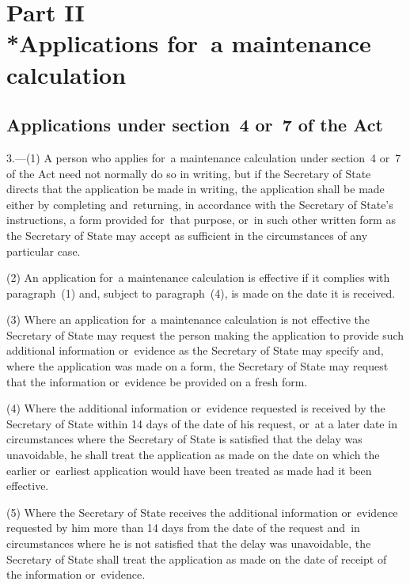 \documentclass[12pt,a4paper]{article}
\begin{document}
\section[Part II --- Applications for~a maintenance calculation]{Part II\\*Applications for~a maintenance calculation}

\renewcommand\parthead{--- Part II}

\subsection[3. Applications under section~4 or~7 of the Act]{Applications under section~4 or~7 of the Act}

3.---(1)  A person who applies for~a maintenance calculation under section~4 or~7 of the Act need not normally do so in writing, but if the Secretary of State directs that the application be made in writing, the application shall be made either by completing and~returning, in accordance with the Secretary of State’s instructions, a form provided for~that purpose, or~in such other written form as the Secretary of State may accept as sufficient in the circumstances of any particular case.

(2) An application for~a maintenance calculation is effective if it complies with paragraph~(1) and, subject to paragraph~(4), is made on the date it is received.

(3) Where an application for~a maintenance calculation is not effective the Secretary of State may request the person making the application to provide such additional information or~evidence as the Secretary of State may specify and, where the application was made on a form, the Secretary of State may request that the information or~evidence be provided on a fresh form.

(4) Where the additional information or~evidence requested is received by the Secretary of State within 14 days of the date of his request, or~at a later date in circumstances where the Secretary of State is satisfied that the delay was unavoidable, he shall treat the application as made on the date on which the earlier or~earliest application would have been treated as made had it been effective.

(5) Where the Secretary of State receives the additional information or~evidence requested by him more than 14 days from the date of the request and~in circumstances where he is not satisfied that the delay was unavoidable, the Secretary of State shall treat the application as made on the date of receipt of the information or~evidence.
\end{document}

